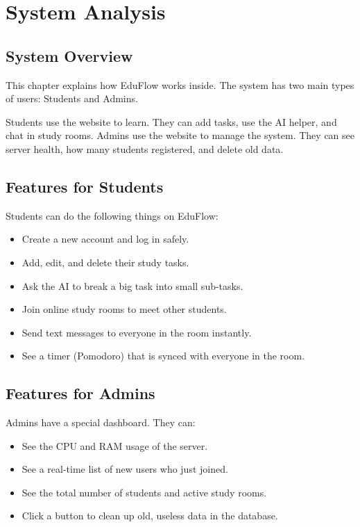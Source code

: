 \documentclass[12pt,a4paper]{report}
\begin{document}
\chapter{System Analysis}

\section{System Overview}
This chapter explains how EduFlow works inside. The system has two main types of users: Students and Admins. 

Students use the website to learn. They can add tasks, use the AI helper, and chat in study rooms. Admins use the website to manage the system. They can see server health, how many students registered, and delete old data.

\section{Features for Students}
Students can do the following things on EduFlow:
\begin{itemize}
    \item Create a new account and log in safely.
    \item Add, edit, and delete their study tasks.
    \item Ask the AI to break a big task into small sub-tasks.
    \item Join online study rooms to meet other students.
    \item Send text messages to everyone in the room instantly.
    \item See a timer (Pomodoro) that is synced with everyone in the room.
\end{itemize}

\section{Features for Admins}
Admins have a special dashboard. They can:
\begin{itemize}
    \item See the CPU and RAM usage of the server.
    \item See a real-time list of new users who just joined.
    \item See the total number of students and active study rooms.
    \item Click a button to clean up old, useless data in the database.
\end{itemize}
\end{document}
